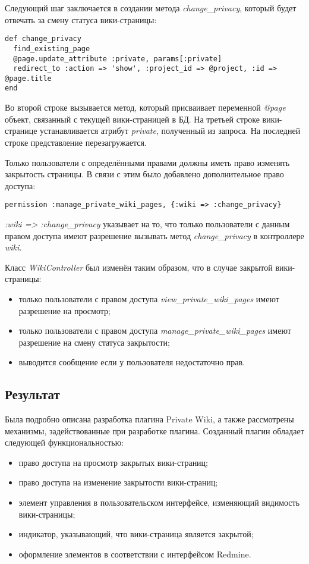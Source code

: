 Следующий шаг заключается в создании метода \textit{change\_privacy}, который
будет отвечать за смену статуса вики-страницы:
\small{\begin{lstlisting}
def change_privacy
  find_existing_page 
  @page.update_attribute :private, params[:private]
  redirect_to :action => 'show', :project_id => @project, :id => @page.title
end
\end{lstlisting}}
Во второй строке вызывается метод, который присваивает переменной
\textit{@page} объект, связанный с текущей вики-страницей в БД. На третьей
строке вики-странице устанавливается атрибут \textit{private}, полученный из
запроса. На последней строке представление перезагружается.

Только пользователи с определёнными правами должны иметь право изменять
закрытость страницы. В связи с этим было добавлено дополнительное право
доступа:
\small{\begin{lstlisting}
permission :manage_private_wiki_pages, {:wiki => :change_privacy}
\end{lstlisting}}
\textit{:wiki => :change\_privacy} указывает на то, что только пользователи с
данным правом доступа имеют разрешение вызывать метод \textit{change\_privacy}
в контроллере \textit{wiki}.

Класс \textit{WikiController} был изменён таким образом, что в случае закрытой
вики-страницы:
\begin{itemize}
  \item только пользователи с правом доступа
  \textit{view\_private\_wiki\_pages} имеют разрешение на просмотр;
  \item только пользователи с правом доступа
  \textit{manage\_private\_wiki\_pages} имеют разрешение на смену статуса
  закрытости;
  \item выводится сообщение если у пользователя недостаточно прав.
\end{itemize}

\subsection{Результат}
Была подробно описана разработка плагина Private Wiki, а также рассмотрены
механизмы, задействованные при разработке плагина. Созданный плагин обладает
следующей функциональностью:
\begin{itemize}
  \item право доступа на просмотр закрытых вики-страниц;
  \item право доступа на изменение закрытости вики-страниц; 
  \item элемент управления в пользовательском интерфейсе, изменяющий
  видимость вики-страницы;
  \item индикатор, указывающий, что вики-страница является закрытой;
  \item оформление элементов в соответствии с интерфейсом Redmine.
\end{itemize}



